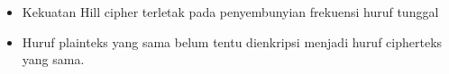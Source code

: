 \documentclass{article}
\begin{document}

\begin{itemize}
    \item Kekuatan Hill cipher terletak pada penyembunyian frekuensi huruf tunggal
    \item Huruf plainteks yang sama belum tentu dienkripsi menjadi huruf cipherteks yang sama.
\end{itemize}
\end{document}
